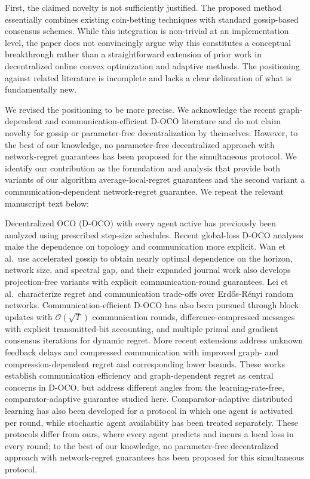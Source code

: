 \documentclass[12pt,english]{reviewresponse}
\begin{document}
\begin{revcomment}
    First, the claimed novelty is not sufficiently justified. The proposed method essentially combines existing coin-betting techniques with standard gossip-based consensus schemes. While this integration is non-trivial at an implementation level, the paper does not convincingly argue why this constitutes a conceptual breakthrough rather than a straightforward extension of prior work in decentralized online convex optimization and adaptive methods. The positioning against related literature is incomplete and lacks a clear delineation of what is fundamentally new.
\end{revcomment}
\begin{revresponse}
    We revised the positioning to be more precise.  We acknowledge the recent graph-dependent and communication-efficient D-OCO literature and do not claim novelty for gossip or parameter-free decentralization by themselves.
    However, to the best of our knowledge, no parameter-free decentralized approach with network-regret guarantees has been proposed for the simultaneous protocol.
    We identify our contribution as the formulation and analysis that provide both variants of our algorithm average-local-regret guarantees and the second variant a communication-dependent network-regret guarantee.  %
    We repeat the relevant manuscript text below:
    \begin{changes}
        Decentralized OCO (D-OCO) with every agent active has previously been analyzed using prescribed step-size schedules.
        Recent global-loss D-OCO analyses make the dependence on topology and communication more explicit.
        Wan et al.\ use accelerated gossip to obtain nearly optimal dependence on the horizon, network size, and spectral gap, and their expanded journal work also develops projection-free variants with explicit communication-round guarantees.
        Lei et al.\ characterize regret and communication trade-offs over Erd\H{o}s-R\'enyi random networks.
        Communication-efficient D-OCO has also been pursued through block updates with $\mathcal{O}(\sqrt{T})$ communication rounds, difference-compressed messages with explicit transmitted-bit accounting, and multiple primal and gradient consensus iterations for dynamic regret.
        More recent extensions address unknown feedback delays and compressed communication with improved graph- and compression-dependent regret and corresponding lower bounds.
        These works establish communication efficiency and graph-dependent regret as central concerns in D-OCO, but address different angles from the learning-rate-free, comparator-adaptive guarantee studied here.
        Comparator-adaptive distributed learning has also been developed for a protocol in which one agent is activated per round, while stochastic agent availability has been treated separately.
        These protocols differ from ours, where every agent predicts and incurs a local loss in every round; to the best of our knowledge, no parameter-free decentralized approach with network-regret guarantees has been proposed for this simultaneous protocol.


\end{changes}
\end{revresponse}
\end{document}
